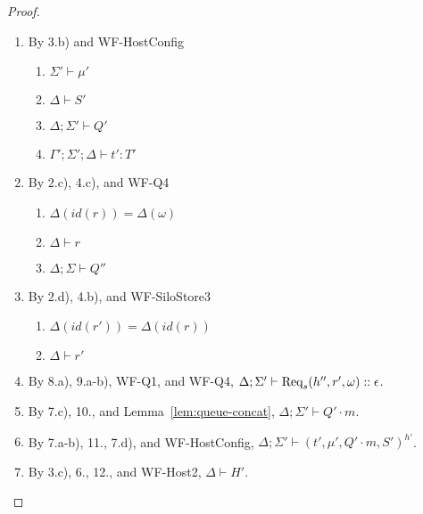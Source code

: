 \begin{proof}
\begin{itemize}
\begin{enumerate}
\item By 3.b) and WF-HostConfig
  \begin{enumerate}[label=(\alph*)]
  \item $\Sigma' \vdash \mu'$
  \item $\Delta \vdash S'$
  \item $\Delta ; \Sigma' \vdash Q'$
  \item $\Gamma' ; \Sigma' ; \Delta \vdash t' : T'$
  \end{enumerate}
\item By 2.c), 4.c), and WF-Q4
  \begin{enumerate}[label=(\alph*)]
  \item $\Delta(id(r)) = \Delta(\omega)$
  \item $\Delta \vdash r$
  \item $\Delta ; \Sigma \vdash Q''$
  \end{enumerate}
\item By 2.d), 4.b), and WF-SiloStore3
  \begin{enumerate}[label=(\alph*)]
  \item $\Delta(id(r')) = \Delta(id(r))$
  \item $\Delta \vdash r'$
  \end{enumerate}
\item By 8.a), 9.a-b), WF-Q1, and WF-Q4, $\Delta ; \Sigma' \vdash {\textrm{Req}_s(h'', r', \omega)} :: \epsilon$.
\item By 7.c), 10., and Lemma~\ref{lem:queue-concat}, $\Delta ; \Sigma' \vdash Q' \cdot m$.
\item By 7.a-b), 11., 7.d), and WF-HostConfig, $\Delta ; \Sigma' \vdash (t', \mu', Q' \cdot m, S')^{h'}$.
\item By 3.c), 6., 12., and WF-Host2, $\Delta \vdash H'$.
\end{enumerate}


\end{itemize}
\end{proof}
